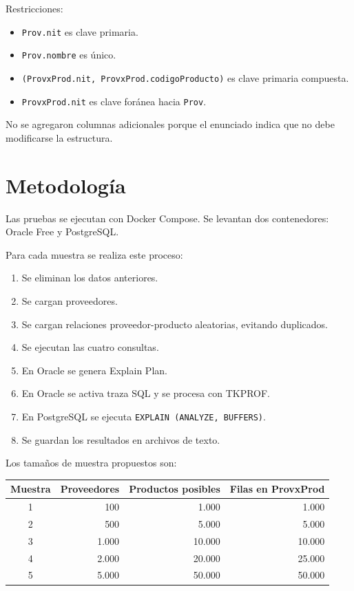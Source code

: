 \documentclass[12pt,a4paper]{article}
\begin{document}
Restricciones:
\begin{itemize}
    \item \texttt{Prov.nit} es clave primaria.
    \item \texttt{Prov.nombre} es único.
    \item \texttt{(ProvxProd.nit, ProvxProd.codigoProducto)} es clave primaria compuesta.
    \item \texttt{ProvxProd.nit} es clave foránea hacia \texttt{Prov}.
\end{itemize}
No se agregaron columnas adicionales porque el enunciado indica que no debe modificarse la estructura.

\section{Metodología}
Las pruebas se ejecutan con Docker Compose. Se levantan dos contenedores: Oracle Free y PostgreSQL.

Para cada muestra se realiza este proceso:
\begin{enumerate}
    \item Se eliminan los datos anteriores.
    \item Se cargan proveedores.
    \item Se cargan relaciones proveedor-producto aleatorias, evitando duplicados.
    \item Se ejecutan las cuatro consultas.
    \item En Oracle se genera Explain Plan.
    \item En Oracle se activa traza SQL y se procesa con TKPROF.
    \item En PostgreSQL se ejecuta \texttt{EXPLAIN (ANALYZE, BUFFERS)}.
    \item Se guardan los resultados en archivos de texto.
\end{enumerate}

Los tamaños de muestra propuestos son:
\begin{table}[h]
\centering
\begin{tabular}{|c|r|r|r|}
\hline
\textbf{Muestra} & \textbf{Proveedores} & \textbf{Productos posibles} & \textbf{Filas en ProvxProd} \\ \hline
1 & 100 & 1.000 & 1.000 \\ \hline
2 & 500 & 5.000 & 5.000 \\ \hline
3 & 1.000 & 10.000 & 10.000 \\ \hline
4 & 2.000 & 20.000 & 25.000 \\ \hline
5 & 5.000 & 50.000 & 50.000 \\ \hline
\end{tabular}
\end{table}
\end{document}
